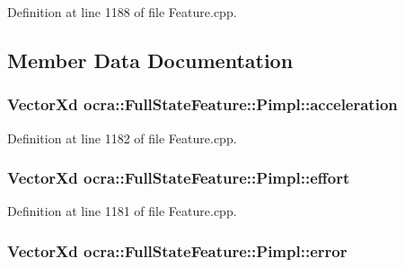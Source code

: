 Definition at line 1188 of file Feature.\+cpp.



\subsection{Member Data Documentation}
\subsubsection[{\texorpdfstring{acceleration}{acceleration}}]{\setlength{\rightskip}{0pt plus 5cm}Vector\+Xd ocra\+::\+Full\+State\+Feature\+::\+Pimpl\+::acceleration}\hypertarget{structocra_1_1FullStateFeature_1_1Pimpl_affdd50d872fa8b7fb0da46f5193e3853}{}\label{structocra_1_1FullStateFeature_1_1Pimpl_affdd50d872fa8b7fb0da46f5193e3853}


Definition at line 1182 of file Feature.\+cpp.

\subsubsection[{\texorpdfstring{effort}{effort}}]{\setlength{\rightskip}{0pt plus 5cm}Vector\+Xd ocra\+::\+Full\+State\+Feature\+::\+Pimpl\+::effort}\hypertarget{structocra_1_1FullStateFeature_1_1Pimpl_a7e2566a7756280de4327e405cab53956}{}\label{structocra_1_1FullStateFeature_1_1Pimpl_a7e2566a7756280de4327e405cab53956}


Definition at line 1181 of file Feature.\+cpp.

\subsubsection[{\texorpdfstring{error}{error}}]{\setlength{\rightskip}{0pt plus 5cm}Vector\+Xd ocra\+::\+Full\+State\+Feature\+::\+Pimpl\+::error}\hypertarget{structocra_1_1FullStateFeature_1_1Pimpl_a37accc4269498c113d450b0106115274}{}\label{structocra_1_1FullStateFeature_1_1Pimpl_a37accc4269498c113d450b0106115274}


